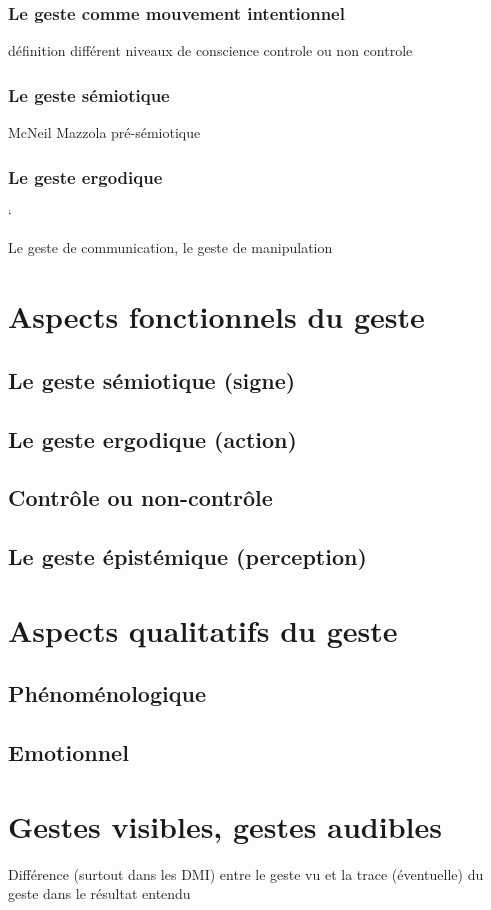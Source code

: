 		\subsubsection{Le geste comme mouvement intentionnel}
			définition
			différent niveaux de conscience
			controle ou non controle
		\subsubsection{Le geste sémiotique}
			McNeil
			Mazzola pré-sémiotique
		\subsubsection{Le geste ergodique}`


Le geste de communication, le geste de manipulation


\section{Aspects fonctionnels du geste}
	\subsection{Le geste sémiotique (signe)}
	\subsection{Le geste ergodique (action)}
	\subsection{Contrôle ou non-contrôle}
	\subsection{Le geste épistémique (perception)}
\section{Aspects qualitatifs du geste}
	\subsection{Phénoménologique}
	\subsection{Emotionnel}


\section{Gestes visibles, gestes audibles}
Différence (surtout dans les DMI) entre le geste vu et la trace (éventuelle) du geste dans le résultat entendu


